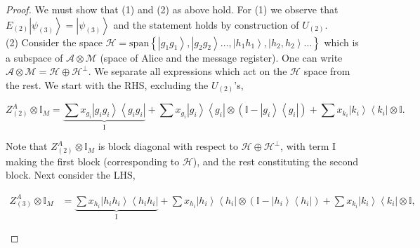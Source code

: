 \documentclass{theoretics}
\begin{document}
\begin{enumerate}
        \begin{proof}
          We must show that (1) and (2) as above hold. For (1)  we observe that $E_{(2)}\left|\psi_{(3)}\right\rangle =\left|\psi_{(3)}\right\rangle $ and
          the statement holds by construction of $U_{(2)}$.\\
          (2) Consider the space $\mathcal{H}=\text{span}\left\{ \left|g_{1}g_{1}\right\rangle ,\left|g_{2}g_{2}\right\rangle \dots,\left|h_{1}h_{1}\right\rangle ,\left|h_{2},h_{2}\right\rangle \dots\right\} $ which is a subspace of $\mathcal{A}\otimes\mathcal{M}$ (space of Alice and the message register). One can write $\mathcal{A}\otimes \mathcal{M}=\mathcal{H} \oplus \mathcal{H}^{\perp}$. %
          We separate all expressions which act on the $\mathcal{H}$
          space from the rest. We start with the RHS,
          excluding the $U_{(2)}$'s,
          \begin{small}
            \begin{displaymath}
              Z_{(2)}^{A}\otimes\mathbb{I}_{M}=\underbrace{\sum x_{g_{i}}\left|g_{i}g_{i}\right\rangle \left\langle g_{i}g_{i}\right|}_{\text{I}}+\sum x_{g_{i}}\left|g_{i}\right\rangle \left\langle g_{i}\right|\otimes\left(\mathbb{I}-\left|g_{i}\right\rangle \left\langle g_{i}\right|\right)+\sum x_{k_{i}}\left|k_{i}\right\rangle \left\langle k_{i}\right|\otimes\mathbb{I}.
            \end{displaymath}
          \end{small}
          Note that $Z_{(2)}^{A}\otimes\mathbb{I}_{M}$ is block diagonal with respect to $\mathcal{H} \oplus \mathcal{H}^{\perp}$, with term I making the first block (corresponding to $\mathcal{H}$), and the rest constituting the second block.
          Next consider the LHS,
          \begin{footnotesize}
            \begin{align*}
              Z_{(3)}^{A}\otimes\mathbb{I}_{M} & =\underbrace{\sum x_{h_{i}}\left|h_{i}h_{i}\right\rangle \left\langle h_{i}h_{i}\right|}_{\text{I}}+\sum x_{h_{i}}\left|h_{i}\right\rangle \left\langle h_{i}\right|\otimes\left(\mathbb{I}-\left|h_{i}\right\rangle \left\langle h_{i}\right|\right)+\sum x_{k_{i}}\left|k_{i}\right\rangle \left\langle k_{i}\right|\otimes\mathbb{I},
            \end{align*}
          \end{footnotesize}


\end{proof}
\end{enumerate}
\end{document}
